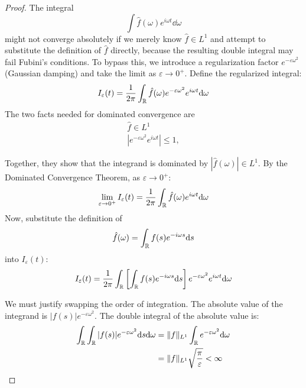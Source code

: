 \begin{proof}
The integral \[
\int \hat{f}(\omega) e^{i\omega t} \dd \omega
\] might not converge absolutely if we merely know $\hat{f} \in L^1$ and attempt to substitute the definition of $\hat{f}$ directly, because the resulting double integral may fail Fubini's conditions. To bypass this, we introduce a regularization factor $e^{-\varepsilon \omega^2}$ (Gaussian damping) and take the limit as $\varepsilon \to 0^+$. Define the regularized integral:
\begin{equation}
I_\varepsilon(t) = \frac{1}{2\pi} \int_{\mathbb{R}} \hat{f}(\omega) e^{-\varepsilon \omega^2} e^{i\omega t} \mathrm{d} \omega
\end{equation}
The two facts needed for dominated convergence are
\[
\begin{gathered}
\hat{f} \in L^1 \\
|e^{-\varepsilon \omega^2} e^{i\omega t}| \leq 1,
\end{gathered}
\]

Together, they show that the integrand is dominated by $|\hat{f}(\omega)| \in L^1$. By the Dominated Convergence Theorem, as $\varepsilon \to 0^+$:
\begin{equation}
\lim_{\varepsilon \to 0^+} I_\varepsilon(t) = \frac{1}{2\pi} \int_{\mathbb{R}} \hat{f}(\omega) e^{i\omega t} \mathrm{d} \omega
\end{equation}
Now, substitute the definition of \[
\hat{f}(\omega) = \int_{\mathbb{R}} f(s) e^{-i\omega s} \mathrm{d} s
\] into $I_\varepsilon(t)$:
\begin{equation}
I_\varepsilon(t) = \frac{1}{2\pi} \int_{\mathbb{R}} \left[ \int_{\mathbb{R}} f(s) e^{-i\omega s} \mathrm{d} s \right] e^{-\varepsilon \omega^2} e^{i\omega t} \mathrm{d} \omega
\end{equation}

We must justify swapping the order of integration. The absolute value of the integrand is $|f(s)| e^{-\varepsilon \omega^2}$. The double integral of the absolute value is:
\begin{equation}
\begin{aligned}
    \int_{\mathbb{R}} \int_{\mathbb{R}} |f(s)| e^{-\varepsilon \omega^2} \mathrm{d} s \mathrm{d} \omega
    &= \|f\|_{L^1} \int_{\mathbb{R}} e^{-\varepsilon \omega^2} \mathrm{d} \omega \\
    &= \|f\|_{L^1} \sqrt{\frac{\pi}{\varepsilon}} < \infty
    \end{aligned}
\end{equation}


\end{proof}
